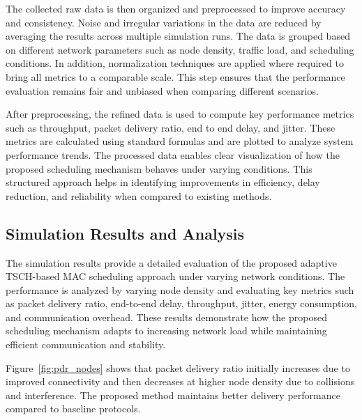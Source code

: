\documentclass[a4paper,fleqn]{cas-dc}
\numberwithin{equation}{section}
\begin{document}
The collected raw data is then organized and preprocessed to improve accuracy and consistency. Noise and irregular variations in the data are reduced by averaging the results across multiple simulation runs. The data is grouped based on different network parameters such as node density, traffic load, and scheduling conditions. In addition, normalization techniques are applied where required to bring all metrics to a comparable scale. This step ensures that the performance evaluation remains fair and unbiased when comparing different scenarios.

After preprocessing, the refined data is used to compute key performance metrics such as throughput, packet delivery ratio, end to end delay, and jitter. These metrics are calculated using standard formulas and are plotted to analyze system performance trends. The processed data enables clear visualization of how the proposed scheduling mechanism behaves under varying conditions. This structured approach helps in identifying improvements in efficiency, delay reduction, and reliability when compared to existing methods.

\subsection{Simulation Results and Analysis}

The simulation results provide a detailed evaluation of the proposed adaptive TSCH-based MAC scheduling approach under varying network conditions. The performance is analyzed by varying node density and evaluating key metrics such as packet delivery ratio, end-to-end delay, throughput, jitter, energy consumption, and communication overhead. These results demonstrate how the proposed scheduling mechanism adapts to increasing network load while maintaining efficient communication and stability.



\begin{center}

\label{fig:pdr_nodes}
\end{center}

Figure~\ref{fig:pdr_nodes} shows that packet delivery ratio initially increases due to improved connectivity and then decreases at higher node density due to collisions and interference. The proposed method maintains better delivery performance compared to baseline protocols.

\vspace{0.3cm}
\end{document}
